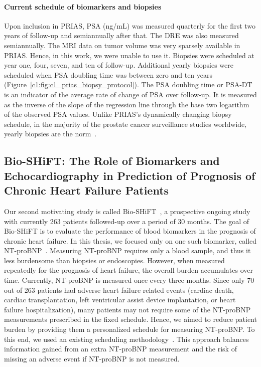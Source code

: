 \paragraph{Current schedule of biomarkers and biopsies} Upon inclusion in PRIAS, PSA (ng/mL) was measured quarterly for the first two years of follow-up and semiannually after that. The DRE was also measured semiannually. The MRI data on tumor volume was very sparsely available in PRIAS. Hence, in this work, we were unable to use it. Biopsies were scheduled at year one, four, seven, and ten of follow-up. Additional yearly biopsies were scheduled when PSA doubling time was between zero and ten years (Figure~\ref{c1:fig:c1_prias_biopsy_protocol}). The PSA doubling time or PSA-DT is an indicator of the average rate of change of PSA over follow-up. It is measured as the inverse of the slope of the regression line through the base two logarithm of the observed PSA values. Unlike PRIAS's dynamically changing biopsy schedule, in the majority of the prostate cancer surveillance studies worldwide, yearly biopsies are the norm~\citep{loeb2014heterogeneity,nieboer2018active}.

\subsection{Bio-SHiFT: The Role of Biomarkers and Echocardiography in Prediction of Prognosis of Chronic Heart Failure Patients}
Our second motivating study is called Bio-SHiFT~\citep{van2018toward}, a prospective ongoing study with currently 263 patients followed-up over a period of 30 months. The goal of Bio-SHiFT is to evaluate the performance of blood biomarkers in the prognosis of chronic heart failure. In this thesis, we focused only on one such biomarker, called NT-proBNP~\citep{bhalla2004b}. Measuring NT-proBNP requires only a blood sample, and thus it less burdensome than biopsies or endoscopies. However, when measured repeatedly for the prognosis of heart failure, the overall burden accumulates over time. Currently, NT-proBNP is measured once every three months. Since only 70 out of 263 patients had adverse heart failure related events (cardiac death, cardiac transplantation, left ventricular assist device implantation, or heart failure hospitalization), many patients may not require some of the NT-proBNP measurements prescribed in the fixed schedule. Hence, we aimed to reduce patient burden by providing them a personalized schedule for measuring NT-proBNP. To this end, we used an existing scheduling methodology~\citep{rizopoulos2016personalized}. This approach balances information gained from an extra NT-proBNP measurement and the risk of missing an adverse event if NT-proBNP is not measured.

